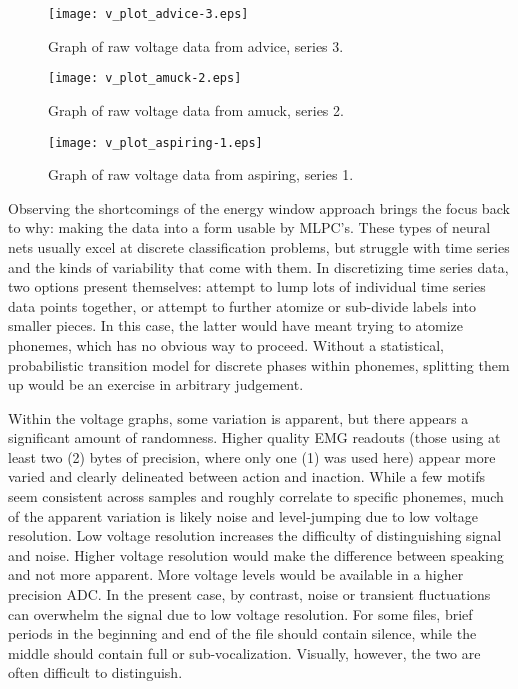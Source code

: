 \documentclass[conference]{IEEEtran}
\begin{document}
\begin{figure}[!t]
\centering
\texttt{[image: v\_plot\_advice-3.eps]}
\caption{Graph of raw voltage data from advice, series 3.}
\label{fig_v2}
\end{figure}

\begin{figure}[!t]
\centering
\texttt{[image: v\_plot\_amuck-2.eps]}
\caption{Graph of raw voltage data from amuck, series 2.}
\label{fig_v3}
\end{figure}

\begin{figure}[!t]
\centering
\texttt{[image: v\_plot\_aspiring-1.eps]}
\caption{Graph of raw voltage data from aspiring, series 1.}
\label{fig_v4}
\end{figure}

Observing the shortcomings of the energy window approach brings the focus back to why: making the data into a form usable by MLPC's. These types of neural nets usually excel at discrete classification problems, but struggle with time series and the kinds of variability that come with them. In discretizing time series data, two options present themselves: attempt to lump lots of individual time series data points together, or attempt to further atomize or sub-divide labels into smaller pieces. In this case, the latter would have meant trying to atomize phonemes, which has no obvious way to proceed. Without a statistical, probabilistic transition model for discrete phases within phonemes, splitting them up would be an exercise in arbitrary judgement.

Within the voltage graphs, some variation is apparent, but there appears a significant amount of randomness. Higher quality EMG readouts (those using at least two (2) bytes of precision, where only one (1) was used here) appear more varied and clearly delineated between action and inaction. While a few motifs seem consistent across samples and roughly correlate to specific phonemes, much of the apparent variation is likely noise and level-jumping due to low voltage resolution. Low voltage resolution increases the difficulty of distinguishing signal and noise. Higher voltage resolution would make the difference between speaking and not more apparent. More voltage levels would be available in a higher precision ADC. In the present case, by contrast, noise or transient fluctuations can overwhelm the signal due to low voltage resolution. For some files, brief periods in the beginning and end of the file should contain silence, while the middle should contain full or sub-vocalization. Visually, however, the two are often difficult to distinguish.
\end{document}
